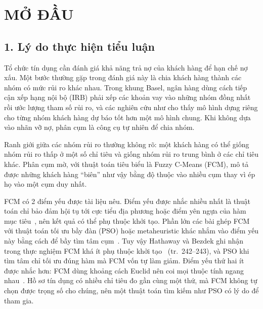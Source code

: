 \chapter*{MỞ ĐẦU}

\section*{1. Lý do thực hiện tiểu luận}

Tổ chức tín dụng cần đánh giá khả năng trả nợ của khách hàng để hạn chế nợ xấu. Một bước thường gặp trong đánh giá này là
chia khách hàng thành các nhóm có mức rủi ro khác nhau. Trong khung Basel, ngân hàng dùng cách tiếp cận xếp hạng nội bộ
(IRB) phải xếp các khoản vay vào những nhóm đồng nhất rồi ước lượng tham số rủi ro, và các nghiên cứu như
\cite{bosker2025clustered,ahelegbey2023p2p} cho thấy mô hình dựng riêng cho từng nhóm khách hàng dự báo tốt hơn một mô hình
chung. Khi không dựa vào nhãn vỡ nợ, phân cụm là công cụ tự nhiên để chia nhóm.

Ranh giới giữa các nhóm rủi ro thường không rõ: một khách hàng có thể giống nhóm rủi ro thấp ở một số chỉ tiêu và giống
nhóm rủi ro trung bình ở các chỉ tiêu khác. Phân cụm mờ, với thuật toán tiêu biểu là Fuzzy C-Means (FCM), mô tả được
những khách hàng ``biên'' như vậy bằng độ thuộc vào nhiều cụm thay vì ép họ vào một cụm duy nhất.

FCM có 2 điểm yếu được tài liệu nêu. Điểm yếu được nhắc nhiều nhất là thuật toán chỉ bảo đảm hội tụ tới cực tiểu địa
phương hoặc điểm yên ngựa của hàm mục tiêu~\cite{bezdek1987counterexamples}, nên kết quả có thể phụ thuộc khởi tạo. Phần lớn
các bài ghép FCM với thuật toán tối ưu bầy đàn (PSO) hoặc metaheuristic khác nhắm vào điểm yếu này bằng cách để bầy tìm tâm
cụm~\cite{qian2022psofcm,zhang2025qpsofcm,mane2014hpso}. Tuy vậy Hathaway và Bezdek ghi nhận trong thực nghiệm FCM khá ít
phụ thuộc khởi tạo~\cite{hathaway1988recent} (tr.~242--243), và PSO khi tìm tâm chỉ tối ưu đúng hàm mà FCM vốn tự làm giảm.
Điểm yếu thứ hai ít được nhắc hơn: FCM dùng khoảng cách Euclid nên coi mọi thuộc tính ngang
nhau~\cite{liu2021msgwo}. Hồ sơ tín dụng có nhiều chỉ tiêu đo gần cùng một thứ, mà FCM không tự chọn được trọng số
cho chúng, nên một thuật toán tìm kiếm như PSO có lý do để tham gia.

